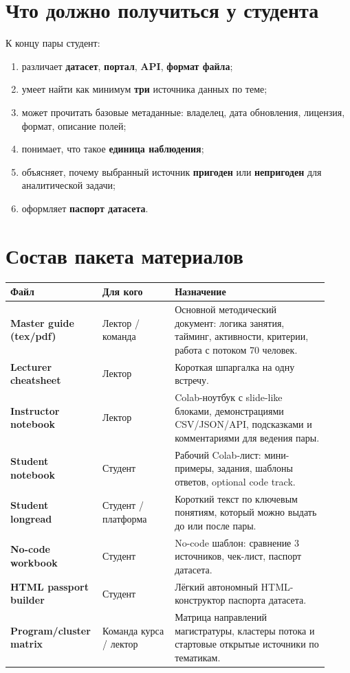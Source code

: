 \documentclass[11pt,a4paper]{article}
\begin{document}
\section{Что должно получиться у студента}

К концу пары студент:
\begin{enumerate}[leftmargin=1.3em]
\item различает \textbf{датасет}, \textbf{портал}, \textbf{API}, \textbf{формат файла};
\item умеет найти как минимум \textbf{три} источника данных по теме;
\item может прочитать базовые метаданные: владелец, дата обновления, лицензия, формат, описание полей;
\item понимает, что такое \textbf{единица наблюдения};
\item объясняет, почему выбранный источник \textbf{пригоден} или \textbf{непригоден} для аналитической задачи;
\item оформляет \textbf{паспорт датасета}.
\end{enumerate}

\section{Состав пакета материалов}

\begin{longtable}{>{\raggedright\arraybackslash}p{0.23\linewidth} >{\raggedright\arraybackslash}p{0.22\linewidth} >{\raggedright\arraybackslash}p{0.47\linewidth}}
\toprule
\textbf{Файл} & \textbf{Для кого} & \textbf{Назначение} \\
\midrule
\endhead
\textbf{Master guide (tex/pdf)} & Лектор / команда & Основной методический документ: логика занятия, тайминг, активности, критерии, работа с потоком 70 человек.\\
\textbf{Lecturer cheatsheet} & Лектор & Короткая шпаргалка на одну встречу.\\
\textbf{Instructor notebook} & Лектор & Colab-ноутбук с slide-like блоками, демонстрациями CSV/JSON/API, подсказками и комментариями для ведения пары.\\
\textbf{Student notebook} & Студент & Рабочий Colab-лист: мини-примеры, задания, шаблоны ответов, optional code track.\\
\textbf{Student longread} & Студент / платформа & Короткий текст по ключевым понятиям, который можно выдать до или после пары.\\
\textbf{No-code workbook} & Студент & No-code шаблон: сравнение 3 источников, чек-лист, паспорт датасета.\\
\textbf{HTML passport builder} & Студент & Лёгкий автономный HTML-конструктор паспорта датасета.\\
\textbf{Program/cluster matrix} & Команда курса / лектор & Матрица направлений магистратуры, кластеры потока и стартовые открытые источники по тематикам.\\
\bottomrule
\end{longtable}
\end{document}
